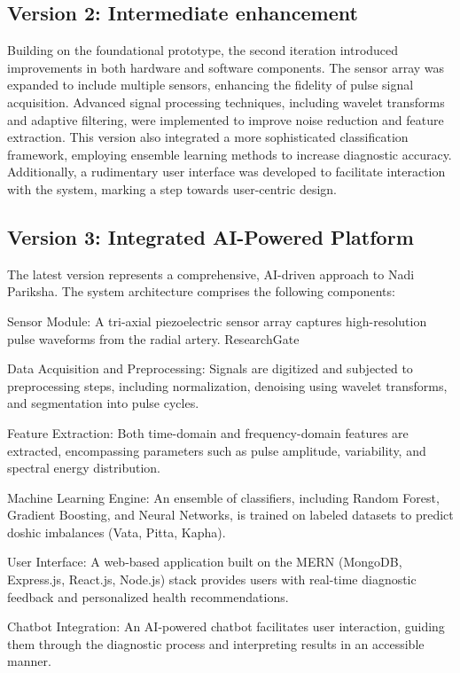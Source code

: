 \documentclass[10pt,twocolumn]{article}
\begin{document}
\subsection{Version 2: Intermediate enhancement}
Building on the foundational prototype, the second iteration introduced improvements in both hardware and software components. The sensor array was expanded to include multiple sensors, enhancing the fidelity of pulse signal acquisition. Advanced signal processing techniques, including wavelet transforms and adaptive filtering, were implemented to improve noise reduction and feature extraction. This version also integrated a more sophisticated classification framework, employing ensemble learning methods to increase diagnostic accuracy. Additionally, a rudimentary user interface was developed to facilitate interaction with the system, marking a step towards user-centric design.

\subsection{Version 3: Integrated AI-Powered Platform}
The latest version represents a comprehensive, AI-driven approach to Nadi Pariksha. The system architecture comprises the following components:

Sensor Module: A tri-axial piezoelectric sensor array captures high-resolution pulse waveforms from the radial artery.
ResearchGate

Data Acquisition and Preprocessing: Signals are digitized and subjected to preprocessing steps, including normalization, denoising using wavelet transforms, and segmentation into pulse cycles.

Feature Extraction: Both time-domain and frequency-domain features are extracted, encompassing parameters such as pulse amplitude, variability, and spectral energy distribution.

Machine Learning Engine: An ensemble of classifiers, including Random Forest, Gradient Boosting, and Neural Networks, is trained on labeled datasets to predict doshic imbalances (Vata, Pitta, Kapha).

User Interface: A web-based application built on the MERN (MongoDB, Express.js, React.js, Node.js) stack provides users with real-time diagnostic feedback and personalized health recommendations.

Chatbot Integration: An AI-powered chatbot facilitates user interaction, guiding them through the diagnostic process and interpreting results in an accessible manner.
\end{document}
